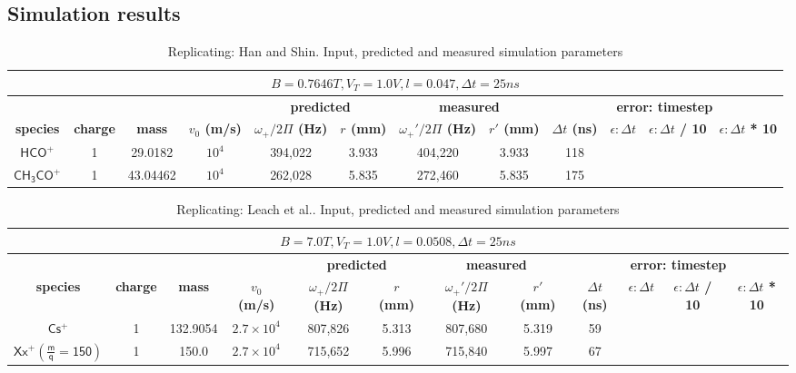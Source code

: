 \documentclass[10pt,conference,onecolumn]{IEEEtran}
\begin{document}
\subsection{Simulation results}

\begin{table}[htbp]
 \centering	  	  
 \caption{Replicating: Han and Shin\cite{Han1997}. Input, predicted and measured simulation parameters}
\label{tab:han}
\begin{tabular}{c|c|c|c|c|c|c|c|c|c|c|c}
 \hline \hline
  \multicolumn{12}{|c|}{$B = 0.7646 T, V_T = 1.0 V, l = 0.047, \Delta t = 25ns$} \\
 \hline \hline
 \multicolumn{4}{|c|}{ } & \multicolumn{2}{|c|}{\textbf{predicted}} & \multicolumn{2}{|c|}{\textbf{measured}} & \multicolumn{4}{|c|}{\textbf{error: timestep}} \\ 
 \hline
 \textbf{species} & \textbf{charge} & \textbf{mass} & \textbf{$v_0$ (m/s)} & \textbf{$\omega_+ / 2\Pi$ (Hz)} & \textbf{$r$ (mm)} & \textbf{$\omega_+' / 2\Pi$ (Hz)}  & \textbf{$r'$ (mm)} & \textbf{$\Delta t$ (ns)} & \textbf{$\epsilon: \Delta t$}& \textbf{$\epsilon: \Delta t$ / 10} & \textbf{$\epsilon: \Delta t$ * 10}\\ 
 \hline
 $\mathsf{HCO^+}$ & 1 & 29.0182 & $10^4$ & 394,022 & 3.933 & 404,220 & 3.933 & 118 & \\
 $\mathsf{CH_3CO^+}$ & 1 & 43.04462 & $10^4$ & 262,028 & 5.835 & 272,460 & 5.835 & 175 & \\
 \hline \hline
\end{tabular}
\end{table}

\begin{table}[htbp]
 \centering	  	  
 \caption{Replicating: Leach et al.\cite{Leach2009}. Input, predicted and measured simulation parameters}
\label{tab:leach}
\begin{tabular}{c|c|c|c|c|c|c|c|c|c|c|c}
 \hline \hline
  \multicolumn{12}{|c|}{$B = 7.0 T, V_T = 1.0 V, l = 0.0508, \Delta t = 25ns$} \\
 \hline \hline
 \multicolumn{4}{|c|}{ } & \multicolumn{2}{|c|}{\textbf{predicted}} & \multicolumn{2}{|c|}{\textbf{measured}} & \multicolumn{4}{|c|}{\textbf{error: timestep}} \\ 
 \hline
 \textbf{species} & \textbf{charge} & \textbf{mass} & \textbf{$v_0$ (m/s)} & \textbf{$\omega_+ / 2\Pi$ (Hz)} & \textbf{$r$ (mm)} & \textbf{$\omega_+' / 2\Pi$ (Hz)}  & \textbf{$r'$ (mm)} & \textbf{$\Delta t$ (ns)} & \textbf{$\epsilon: \Delta t$}& \textbf{$\epsilon: \Delta t$ / 10} & \textbf{$\epsilon: \Delta t$ * 10}\\ 
 \hline
 $\mathsf{Cs^+}$                   & 1 & 132.9054 & $2.7 \times 10^4$ & 807,826 & 5.313 & 807,680 & 5.319 & 59 & \\
 $\mathsf{Xx^+ (\frac{m}{q} = 150 )}$ & 1 & 150.0 & $2.7 \times 10^4$ & 715,652 & 5.996 & 715,840 & 5.997 & 67 & \\
 \hline \hline
\end{tabular}
\end{table}
\end{document}
